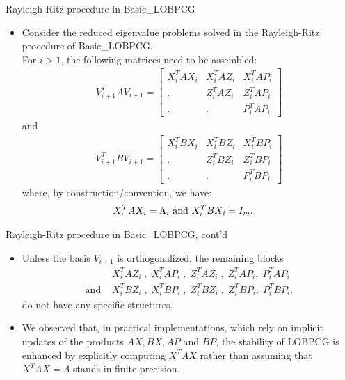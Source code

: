 \documentclass[t,usepdftitle=false]{beamer}
\begin{document}
\begin{frame}{Rayleigh-Ritz procedure in Basic\_LOBPCG}
	\begin{itemize}
		\item Consider the reduced eigenvalue problems solved in the Rayleigh-Ritz procedure of Basic\_LOBPCG.\\
		For $i>1$, the following matrices need to be assembled:
		\begin{align*}
			V_{i+1}^TAV_{i+1}=
			\begin{bmatrix}
				X_{i}^TAX_i&X_{i}^TAZ_i&X_{i}^TAP_{i}\\
				.&Z_{i}^TAZ_i&Z_{i}^TAP_{i}\\
				.&.&P_{i}^TAP_{i}
			\end{bmatrix}
		\end{align*}
		and 
		\begin{align*}
			V_{i+1}^TBV_{i+1}=
			\begin{bmatrix}
				X_{i}^TBX_i&X_{i}^TBZ_i&X_{i}^TBP_{i}\\
				.&Z_{i}^TBZ_i&Z_{i}^TBP_{i}\\
				.&.&P_{i}^TBP_{i}
			\end{bmatrix}
		\end{align*}
		where, by construction/convention, we have:
		\begin{align*}
			\hspace{-.4cm}
			X_i^TAX_i=\Lambda_i
			\text{ and }
			X_i^TBX_i=I_{m}.
		\end{align*}
	\end{itemize}
\end{frame}

\begin{frame}{Rayleigh-Ritz procedure in Basic\_LOBPCG, cont'd}
	\begin{itemize}
	\item[] Unless the basis $V_{i+1}$ is orthogonalized, the remaining blocks
	\begin{align*}
	&X_{i}^TAZ_i\;,\;
	X_{i}^TAP_{i}\;,\;
	Z_{i}^TAZ_i\;,\;
	Z_{i}^TAP_{i},\;
	P_i^TAP_i\\
	\text{and }
	&X_{i}^TBZ_i\;,\;
	X_{i}^TBP_{i}\;,\;
	Z_{i}^TBZ_i\;,\;
	Z_{i}^TBP_{i},\;
	P_i^TBP_i.
	\end{align*}
	do not have any specific structures.
	\item We observed that, in practical implementations, which rely on implicit updates of the products $AX,BX,AP$ and $BP$, the stability of LOBPCG is enhanced by explicitly computing $X^TAX$ rather than assuming that $X^TAX=\Lambda$ stands in finite precision.
	\end{itemize}
\end{frame}
\end{document}
